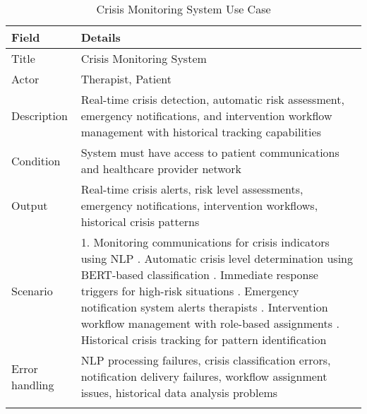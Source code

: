 \begin{longtable}{|p{3cm}|p{12cm}|}
\hline
\textbf{Field} & \textbf{Details} \\
\hline
Title & Crisis Monitoring System \\
\hline
Actor & Therapist, Patient \\
\hline
Description & Real-time crisis detection, automatic risk assessment, emergency notifications, and intervention workflow management with historical tracking capabilities \\
\hline
Condition & System must have access to patient communications and healthcare provider network \\
\hline
Output & Real-time crisis alerts, risk level assessments, emergency notifications, intervention workflows, historical crisis patterns \\
\hline
Scenario & 1. Monitoring communications for crisis indicators using NLP \newline 2. Automatic crisis level determination using BERT-based classification \newline 3. Immediate response triggers for high-risk situations \newline 4. Emergency notification system alerts therapists \newline 5. Intervention workflow management with role-based assignments \newline 6. Historical crisis tracking for pattern identification \\
\hline
Error handling & NLP processing failures, crisis classification errors, notification delivery failures, workflow assignment issues, historical data analysis problems \\
\hline
\caption{Crisis Monitoring System Use Case}
\end{longtable}

